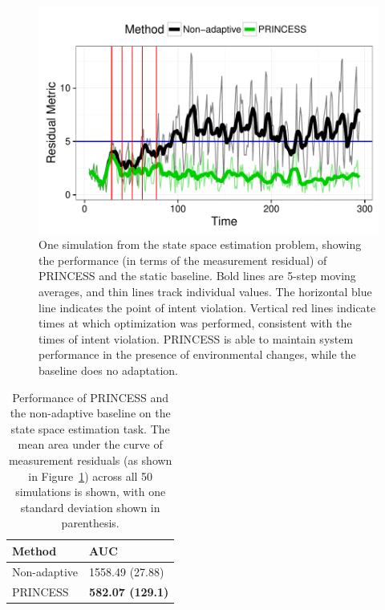 \documentclass[letterpaper]{article}
\begin{document}
\begin{figure}
	\centering
	\includegraphics[width=\linewidth]{figures/kf-optimization-example.pdf}
	\caption{One simulation from the state space estimation problem, showing the performance (in terms of the measurement residual) of PRINCESS and the static baseline. 
	Bold lines are 5-step moving averages, and thin lines track individual values.
	The horizontal blue line indicates the point of intent violation.
	Vertical red lines indicate times at which optimization was performed, consistent with the times of intent violation.
	PRINCESS is able to maintain system performance in the presence of environmental changes, while the baseline does no adaptation.}
	\label{fig:state-space-estimation-example}
\end{figure}

\begin{table}[t]
\centering
\begin{tabular}{ll}
  \hline
Method & AUC \\ 
  \hline
Non-adaptive & 1558.49 (27.88) \\ 
  PRINCESS & \textbf{582.07 (129.1)} \\ 
   \hline
\end{tabular}
\caption{
Performance of PRINCESS and the non-adaptive baseline on the state space estimation task.
The mean area under the curve of measurement residuals (as shown in Figure~\ref{fig:state-space-estimation-example}) across all 50 simulations is shown, with one standard deviation shown in parenthesis.}
\label{fig:state-space-estimation-results}
\end{table}
\end{document}
